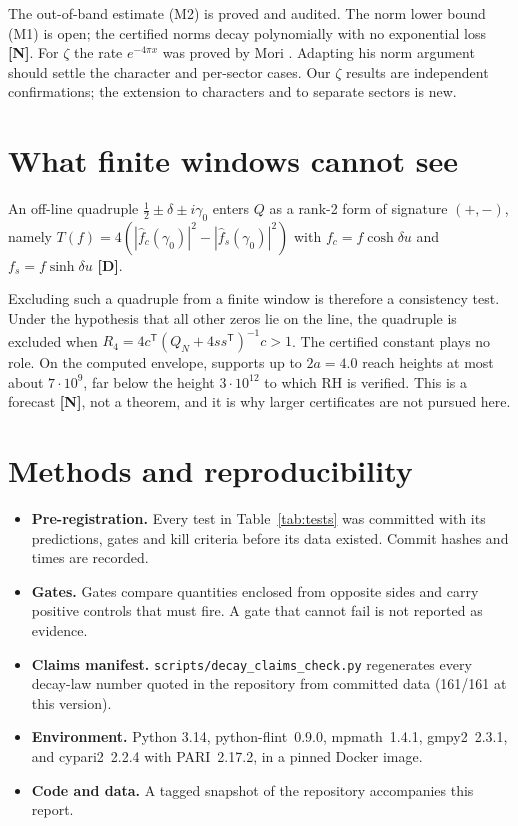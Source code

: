 \documentclass[11pt]{article}
\theoremstyle{remark}
\newcommand{\tagD}{\textbf{[D]}}
\newcommand{\tagN}{\textbf{[N]}}
\begin{document}
The out-of-band estimate (M2) is proved and audited. The norm lower bound (M1) is open; the certified norms decay polynomially with no exponential loss \tagN. For $\zeta$ the rate $e^{-4\pi x}$ was proved by Mori \cite{mori26a,mori26b}. Adapting his norm argument should settle the character and per-sector cases. Our $\zeta$ results are independent confirmations; the extension to characters and to separate sectors is new.

\section{What finite windows cannot see}\label{sec:r1}
An off-line quadruple $\tfrac12\pm\delta\pm i\gamma_0$ enters $Q$ as a rank-2 form of signature $(+,-)$, namely $T(f)=4(|\hat f_c(\gamma_0)|^2-|\hat f_s(\gamma_0)|^2)$ with $f_c=f\cosh\delta u$ and $f_s=f\sinh\delta u$ \tagD.

Excluding such a quadruple from a finite window is therefore a consistency test. Under the hypothesis that all other zeros lie on the line, the quadruple is excluded when $R_4=4c^{\mathsf T}(Q_N+4ss^{\mathsf T})^{-1}c>1$. The certified constant plays no role. On the computed envelope, supports up to $2a=4.0$ reach heights at most about $7\cdot10^9$, far below the height $3\cdot10^{12}$ to which RH is verified. This is a forecast \tagN, not a theorem, and it is why larger certificates are not pursued here.

\section{Methods and reproducibility}
\begin{itemize}
\item \textbf{Pre-registration.} Every test in Table~\ref{tab:tests} was committed with its predictions, gates and kill criteria before its data existed. Commit hashes and times are recorded.
\item \textbf{Gates.} Gates compare quantities enclosed from opposite sides and carry positive controls that must fire. A gate that cannot fail is not reported as evidence.
\item \textbf{Claims manifest.} \texttt{scripts/decay\_claims\_check.py} regenerates every decay-law number quoted in the repository from committed data (161/161 at this version).
\item \textbf{Environment.} Python 3.14, python-flint~0.9.0, mpmath~1.4.1, gmpy2~2.3.1, and cypari2~2.2.4 with PARI~2.17.2, in a pinned Docker image.
\item \textbf{Code and data.} A tagged snapshot of the repository accompanies this report.
\end{itemize}
\end{document}

